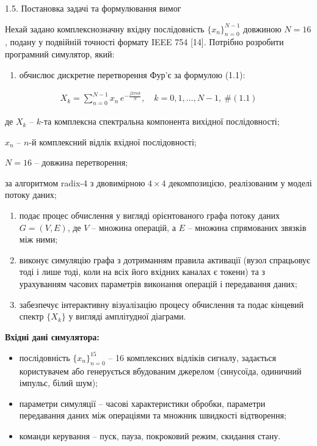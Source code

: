 \documentclass[
]{article}
\begin{document}
\protect{}\label{X124bb00a71ff7da6d40a6aa8e0ae644d11036d1}{}1.5.
Постановка задачі та формулювання вимог

Нехай задано комплекснозначну вхідну послідовність
\(\{ x_{n}\}_{n = 0}^{N - 1}\) довжиною \(N = 16\), подану у подвійній
точності формату IEEE 754 {[}14{]}. Потрібно розробити програмний
симулятор, який:

\begin{enumerate}
\def\labelenumi{\arabic{enumi})}
\item
  обчислює дискретне перетворення Фур'є за формулою (1.1):
\end{enumerate}

\[\begin{array}{r}
X_{k} = \sum_{n = 0}^{N - 1}x_{n}\, e^{- \frac{j2\pi nk}{N}},\quad k = 0,1,\ldots,N - 1,\ \#(1.1)
\end{array}\]

де \(X_{k}\) -- \(k\)-та комплексна спектральна компонента вихідної
послідовності;

\(x_{n}\) -- \(n\)-й комплексний відлік вхідної послідовності;

\(N = 16\) -- довжина перетворення;

за алгоритмом radix-4 з двовимірною \(4 \times 4\) декомпозицією,
реалізованим у моделі потоку даних;

\begin{enumerate}
\def\labelenumi{\arabic{enumi})}
\setcounter{enumi}{1}
\item
  подає процес обчислення у вигляді орієнтованого графа потоку даних
  \(G = (V,E)\), де \(V\) -- множина операцій, а \(E\) -- множина
  спрямованих зв\textquotesingle язків між ними;
\item
  виконує симуляцію графа з дотриманням правила активації (вузол
  спрацьовує тоді і лише тоді, коли на всіх його вхідних каналах є
  токени) та з урахуванням часових параметрів виконання операцій і
  передавання даних;
\item
  забезпечує інтерактивну візуалізацію процесу обчислення та подає
  кінцевий спектр \(\{ X_{k}\}\) у вигляді амплітудної діаграми.
\end{enumerate}

\textbf{Вхідні дані симулятора:}

\begin{itemize}
\item
  послідовність \(\{ x_{n}\}_{n = 0}^{15}\) -- 16 комплексних відліків
  сигналу, задається користувачем або генерується вбудованим джерелом
  (синусоїда, одиничний імпульс, білий шум);
\item
  параметри симуляції -- часові характеристики обробки, параметри
  передавання даних між операціями та множник швидкості відтворення;
\item
  команди керування -- пуск, пауза, покроковий режим, скидання стану.
\end{itemize}
\end{document}
